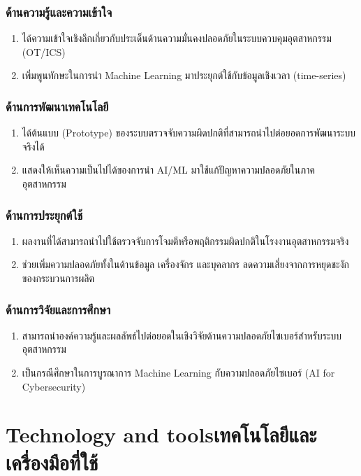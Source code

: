 \subsubsection{ด้านความรู้และความเข้าใจ}
\begin{enumerate}
    \item ได้ความเข้าใจเชิงลึกเกี่ยวกับประเด็นด้านความมั่นคงปลอดภัยในระบบควบคุมอุตสาหกรรม (OT/ICS)
    \item เพิ่มพูนทักษะในการนำ Machine Learning มาประยุกต์ใช้กับข้อมูลเชิงเวลา (time-series)
\end{enumerate}

\subsubsection{ด้านการพัฒนาเทคโนโลยี}
\begin{enumerate}
    \item ได้ต้นแบบ (Prototype) ของระบบตรวจจับความผิดปกติที่สามารถนำไปต่อยอดการพัฒนาระบบจริงได้
    \item แสดงให้เห็นความเป็นไปได้ของการนำ AI/ML มาใช้แก้ปัญหาความปลอดภัยในภาคอุตสาหกรรม
\end{enumerate}

\subsubsection{ด้านการประยุกต์ใช้}
\begin{enumerate}
    \item ผลงานที่ได้สามารถนำไปใช้ตรวจจับการโจมตีหรือพฤติกรรมผิดปกติในโรงงานอุตสาหกรรมจริง
    \item ช่วยเพิ่มความปลอดภัยทั้งในด้านข้อมูล เครื่องจักร และบุคลากร ลดความเสี่ยงจากการหยุดชะงักของกระบวนการผลิต
\end{enumerate}

\subsubsection{ด้านการวิจัยและการศึกษา}
\begin{enumerate}
    \item สามารถนำองค์ความรู้และผลลัพธ์ไปต่อยอดในเชิงวิจัยด้านความปลอดภัยไซเบอร์สำหรับระบบอุตสาหกรรม
    \item เป็นกรณีศึกษาในการบูรณาการ Machine Learning กับความปลอดภัยไซเบอร์ (AI for Cybersecurity)
\end{enumerate}

\section{\ifenglish Technology and tools\else เทคโนโลยีและเครื่องมือที่ใช้\fi}


